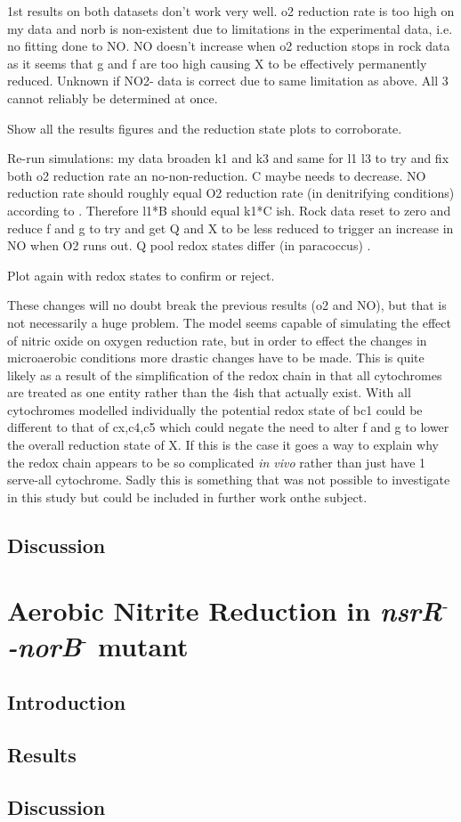 \afterpage{\clearpage}





1st results on both datasets don't work very well. o2 reduction rate is too high on my data and norb is non-existent due to limitations in the experimental data, i.e. no fitting done to NO. NO doesn't increase when o2 reduction stops in rock data as it seems that g and f are too high causing X to be effectively permanently reduced. Unknown if NO2- data is correct due to same limitation as above. All 3 cannot reliably be determined at once.

Show all the results figures and the reduction state plots to corroborate.

Re-run simulations: my data broaden k1 and k3 and same for l1 l3 to try and fix both o2 reduction rate an no-non-reduction. C maybe needs to decrease. NO reduction rate should roughly equal O2 reduction rate (in denitrifying conditions) according to \citet{Rock2005}. Therefore l1*B should equal k1*C ish.
Rock data reset to zero and reduce f and g to try and get Q and X to be less reduced to trigger an increase in NO when O2 runs out. Q pool redox states differ (in paracoccus) \cite{Otten1999}.

Plot again with redox states to confirm or reject.

These changes will no doubt break the previous results (o2 and NO), but that is not necessarily a huge problem. The model seems capable of simulating the effect of nitric oxide on oxygen reduction rate, but in order to effect the changes in microaerobic conditions more drastic changes have to be made. This is quite likely as a result of the simplification of the redox chain in that all cytochromes are treated as one entity rather than the 4ish that actually exist. With all cytochromes modelled individually the potential redox state of bc1 could be different to that of cx,c4,c5 which could negate the need to alter f and g to lower the overall reduction state of X. If this is the case it goes a way to explain why the redox chain appears to be so complicated \textit{in vivo} rather than just have 1 serve-all cytochrome. Sadly this is something that was not possible to investigate in this study but could be included in further work onthe subject.

\subsection{Discussion}
\section{\texorpdfstring{Aerobic Nitrite Reduction in \textit{nsrR$^\textrm{-}$-norB$^\textrm{-}$} mutant}{Aerobic Nitrite Reduction in nsrR- - norB- mutant}}
\subsection{Introduction}
\subsection{Results}
\subsection{Discussion}